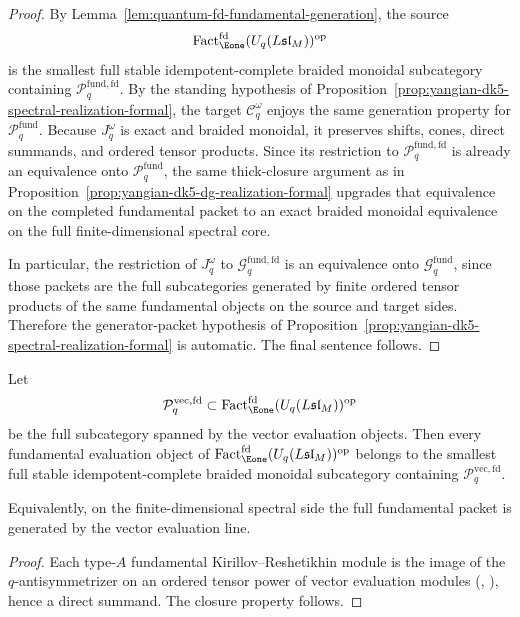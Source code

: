 \begin{proof}
By Lemma~\ref{lem:quantum-fd-fundamental-generation}, the source
\[
\operatorname{Fact}_{\Eone}^{\mathrm{fd}}(U_q(L\mathfrak{sl}_M))^{\mathrm{op}}
\]
is the smallest full stable idempotent-complete braided monoidal
subcategory containing \(\mathcal{P}^{\mathrm{fund,fd}}_{q}\). By the
standing hypothesis of
Proposition~\ref{prop:yangian-dk5-spectral-realization-formal}, the
target \(\mathcal{C}_q^\omega\) enjoys the same generation property for
\(\mathcal{P}^{\mathrm{fund}}_{q}\). Because \(J_q^\omega\) is exact
and braided monoidal, it preserves shifts, cones, direct summands, and
ordered tensor products. Since its restriction to
\(\mathcal{P}^{\mathrm{fund,fd}}_{q}\) is already an equivalence onto
\(\mathcal{P}^{\mathrm{fund}}_{q}\), the same thick-closure argument as
in Proposition~\ref{prop:yangian-dk5-dg-realization-formal} upgrades
that equivalence on the completed fundamental packet to an exact
braided monoidal equivalence on the full finite-dimensional spectral
core.

In particular, the restriction of \(J_q^\omega\) to
\(\mathcal{G}^{\mathrm{fund,fd}}_{q}\) is an equivalence onto
\(\mathcal{G}^{\mathrm{fund}}_{q}\), since those packets are the full
subcategories generated by finite ordered tensor products of the same
fundamental objects on the source and target sides. Therefore the
generator-packet hypothesis of
Proposition~\ref{prop:yangian-dk5-spectral-realization-formal} is
automatic. The final sentence follows.
\end{proof}

\begin{lemma}
\label{lem:quantum-fd-vector-fundamental-generation}
Let
\[
\mathcal{P}^{\mathrm{vec,fd}}_{q}
\subset
\operatorname{Fact}_{\Eone}^{\mathrm{fd}}(U_q(L\mathfrak{sl}_M))^{\mathrm{op}}
\]
be the full subcategory spanned by the vector evaluation objects.
Then every fundamental evaluation object of
\(\operatorname{Fact}_{\Eone}^{\mathrm{fd}}(U_q(L\mathfrak{sl}_M))^{\mathrm{op}}\)
belongs to the smallest full stable idempotent-complete braided
monoidal subcategory containing
\(\mathcal{P}^{\mathrm{vec,fd}}_{q}\).

Equivalently, on the finite-dimensional spectral side the full
fundamental packet is generated by the vector evaluation line.
\end{lemma}

\begin{proof}
Each type-$A$ fundamental Kirillov--Reshetikhin module is the image of
the $q$-antisymmetrizer on an ordered tensor power of vector
evaluation modules (\cite[Ch.~12]{ChariPressley94},
\cite[\S2]{Hernandez05}), hence a direct summand. The closure
property follows.
\end{proof}

